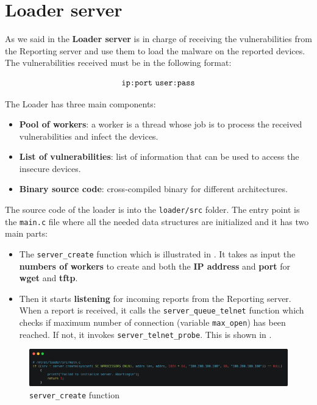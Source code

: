 \section{Loader server}

As we said in  the \textbf{Loader server} is in charge of receiving the vulnerabilities from the Reporting server and use them to load the malware on the reported devices. The vulnerabilities received must be in the following format:

\[ \text{\texttt{ip:port} \texttt{user:pass}} \]

The Loader has three main components:
\begin{itemize}
    \item \textbf{Pool of workers}: a worker is a thread whose job is to process the received vulnerabilities and infect the devices. 
    \item \textbf{List of vulnerabilities}: list of information that can be used to access the insecure devices. 
    \item \textbf{Binary source code}: cross-compiled binary for different architectures. 
\end{itemize}

The source code of the loader is into the \texttt{loader/src} folder. The entry point is the \texttt{main.c} file where all the needed data structures are initialized and it has two main parts:

\begin{itemize}
    \item The \texttt{server\_create} function which is illustrated in . It takes as input the \textbf{numbers of workers} to create and both the \textbf{IP address} and \textbf{port} for \textbf{wget} and \textbf{tftp}.
    \item Then it starts \textbf{listening} for incoming reports from the Reporting server. When a report is received, it calls the \texttt{server\_queue\_telnet} function which checks if maximum number of connection (variable \texttt{max\_open}) has been reached. If not, it invokes \texttt{server\_telnet\_probe}. This is shown in .
\end{itemize}

\begin{figure}[ht]
    \centering
    \includegraphics[scale=0.1]{resources/images/server_create.png}
    \caption{\texttt{server\_create} function}
    \label{fig:server-create}
\end{figure}

